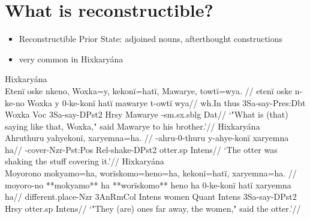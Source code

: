 \documentclass[10pt]{article}
\begin{document}

\section{What is reconstructible?}

\begin{itemize}
\tightlist
\item
  Reconstructible Prior State: adjoined nouns, afterthought
  constructions 
\item
  very common in Hixkaryána
  \parencites[101-104, 129-135]{hixkaryanaderby1985}
\end{itemize}

\pex\label{}    \a Hixkaryána\\
    \label{derbyshire-1965-p-052-the-origin-of-mawarye-and-woxka-235}        \begingl
        \glpreamble Etenï oske nkeno, Woxka=y, kekonï=hatï, Mawarye, towtï=wya. //
        \gla etenï oske n-ke-no Woxka y 0-ke-konï hatï mawarye t-owtï wya//
        \glb wh.In thus 3Sa-say-Pres:Dbt Woxka Voc 3Sa-say-DPst2 Hrsy Mawarye -sm.sx.sblg Dat//
            \glft ‘"What is (that) saying like that, Woxka," said Mawarye to his brother.’//  
        \endgl 
    \a Hixkaryána\\
    \label{derbyshire-1965-p-061-the-wives-of-mawarye-and-woxka-040}        \begingl
        \glpreamble Ahruthuru yahyekonï, xaryemna=ha. //
        -ahru-0-thuru y-ahye-konï xaryemna ha//
        \glb {}-cover-Nzr-Pst:Pos Rel-shake-DPst2 otter.sp Intens//
            \glft ‘The otter was shaking the stuff covering it.’//  
        \endgl 
    \a Hixkaryána\\
    \label{derbyshire-1965-p-062-the-wives-of-mawarye-and-woxka-071}        \begingl
        \glpreamble Moyorono mokyamo=ha, worïskomo=heno=ha, kekonï=hatï, xaryemna=ha. //
        \gla moyoro-no **mokyamo** ha **worïskomo** heno ha 0-ke-konï hatï xaryemna ha//
        \glb different.place-Nzr 3AnRmCol Intens women Quant Intens 3Sa-say-DPst2 Hrsy otter.sp Intens//
            \glft ‘"They (are) ones far away, the women," said the otter.’//  
        \endgl 
\xe
\end{document}
